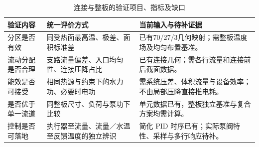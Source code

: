 \documentclass[UTF8]{midterm}
\begin{document}
\begin{table}[!htbp]\centering\small
\caption{连接与整板的验证项目、指标及缺口}\label{tab:system_checks}
\begin{tabularx}{\linewidth}{@{}Y Y Y@{}}\toprule
{} 验证内容 & 统一评价方式 & 当前输入与待补证据 \\\midrule
分区是否有效 & 同受热面最高温、极差、面积标准差 & 已有70/27/3几何映射；需整板温度场及均匀布置基准。\\
流动分配是否合理 & 支路流量偏差、入口均匀性、连接压降占比 & 已有连接几何；需各行流量和连接前后截面数据。\\
能效是否可接受 & 相同热源与约束下的水力功、必要时电功 & 需系统压差、体积流量与设备效率；不由局部压降直接推电耗。\\
是否优于单一流道 & 同整板尺寸、负荷与泵功下比较 & 单元数据已有，整板独立基准与复合方案均需计算。\\
控制是否可落地 & 执行器至流量、流量／水温至反馈温度的独立辨识 & 简化 PID 时序已有；实际泵阀特性、采样与多行响应待补。\\
\bottomrule\end{tabularx}\end{table}
\clearpage
\end{document}
